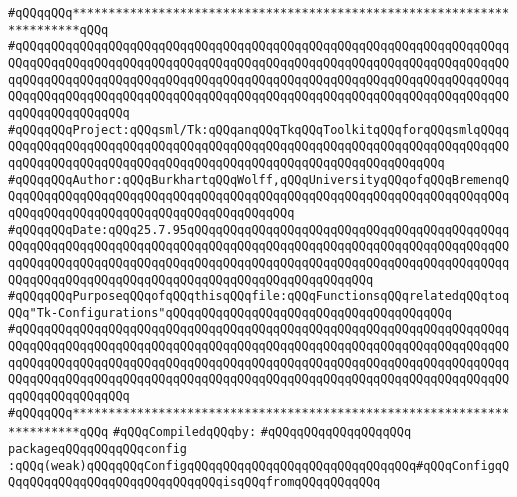\label{src/lib/tk/src/config.pkg}
\verb|#qQQqqQQq***********************************************************************qQQq|\newline
\verb|#qQQqqQQqqQQqqQQqqQQqqQQqqQQqqQQqqQQqqQQqqQQqqQQqqQQqqQQqqQQqqQQqqQQqqQQqqQQqqQQqqQQqqQQqqQQqqQQqqQQqqQQqqQQqqQQqqQQqqQQqqQQqqQQqqQQqqQQqqQQqqQQqqQQqqQQqqQQqqQQqqQQqqQQqqQQqqQQqqQQqqQQqqQQqqQQqqQQqqQQqqQQqqQQqqQQqqQQqqQQqqQQqqQQqqQQqqQQqqQQqqQQqqQQqqQQqqQQqqQQqqQQqqQQqqQQqqQQqqQQqqQQqqQQqqQQqqQQq|\newline
\verb|#qQQqqQQqProject:qQQqsml/Tk:qQQqanqQQqTkqQQqToolkitqQQqforqQQqsmlqQQqqQQqqQQqqQQqqQQqqQQqqQQqqQQqqQQqqQQqqQQqqQQqqQQqqQQqqQQqqQQqqQQqqQQqqQQqqQQqqQQqqQQqqQQqqQQqqQQqqQQqqQQqqQQqqQQqqQQqqQQqqQQqqQQqqQQq|\newline
\verb|#qQQqqQQqAuthor:qQQqBurkhartqQQqWolff,qQQqUniversityqQQqofqQQqBremenqQQqqQQqqQQqqQQqqQQqqQQqqQQqqQQqqQQqqQQqqQQqqQQqqQQqqQQqqQQqqQQqqQQqqQQqqQQqqQQqqQQqqQQqqQQqqQQqqQQqqQQqqQQqqQQq|\newline
\verb|#qQQqqQQqDate:qQQq25.7.95qQQqqQQqqQQqqQQqqQQqqQQqqQQqqQQqqQQqqQQqqQQqqQQqqQQqqQQqqQQqqQQqqQQqqQQqqQQqqQQqqQQqqQQqqQQqqQQqqQQqqQQqqQQqqQQqqQQqqQQqqQQqqQQqqQQqqQQqqQQqqQQqqQQqqQQqqQQqqQQqqQQqqQQqqQQqqQQqqQQqqQQqqQQqqQQqqQQqqQQqqQQqqQQqqQQqqQQqqQQqqQQqqQQqqQQqqQQq|\newline
\verb|#qQQqqQQqPurposeqQQqofqQQqthisqQQqfile:qQQqFunctionsqQQqrelatedqQQqtoqQQq"Tk-Configurations"qQQqqQQqqQQqqQQqqQQqqQQqqQQqqQQqqQQqqQQq|\newline
\verb|#qQQqqQQqqQQqqQQqqQQqqQQqqQQqqQQqqQQqqQQqqQQqqQQqqQQqqQQqqQQqqQQqqQQqqQQqqQQqqQQqqQQqqQQqqQQqqQQqqQQqqQQqqQQqqQQqqQQqqQQqqQQqqQQqqQQqqQQqqQQqqQQqqQQqqQQqqQQqqQQqqQQqqQQqqQQqqQQqqQQqqQQqqQQqqQQqqQQqqQQqqQQqqQQqqQQqqQQqqQQqqQQqqQQqqQQqqQQqqQQqqQQqqQQqqQQqqQQqqQQqqQQqqQQqqQQqqQQqqQQqqQQqqQQqqQQqqQQq|\newline
\verb|#qQQqqQQq***********************************************************************qQQq|\newline
\newline
\verb|#qQQqCompiledqQQqby:|\newline
\verb|#qQQqqQQqqQQqqQQqqQQq|\newline
\newline
\verb|packageqQQqqQQqqQQqconfig|\newline
\verb|:qQQq(weak)qQQqqQQqConfigqQQqqQQqqQQqqQQqqQQqqQQqqQQqqQQq#qQQqConfigqQQqqQQqqQQqqQQqqQQqqQQqqQQqqQQqisqQQqfromqQQqqQQqqQQq|\newline
